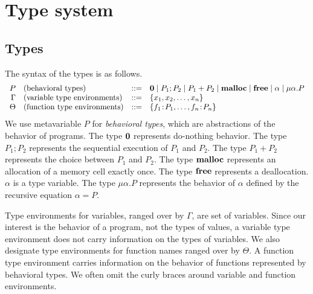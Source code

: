 
\section{Type system}
\label{sec:typesystem}

\subsection{Types}

The syntax of the types is as follows.
\[
\begin{array}{rlcl}
  P & (\mbox{behavioral types})&::=& {\bf 0} \;|\; P_{1};P_{2} \;|\; P_{1}+P_{2} \;|\; \mathbf{malloc} \;|\; \mathbf{free} \;|\; \alpha \;|\; \mu\alpha.P \\
  \Gamma & (\mbox{variable type environments}) &::=& \{x_1, x_2, \dots, x_n\}\\
  \Theta & (\mbox{function type environments}) &::=& \{f_1\!:\! P_1,\dots,f_n\!:\! P_n\}\\
\end{array}
\]
We use metavariable \(P\) for \emph{behavioral types}, which are
abstractions of the behavior of programs.  The type ${\bf 0}$
represents do-nothing behavior.  The type \(P_1;P_2\) represents the
sequential execution of \(P_1\) and \(P_2\).  The type \(P_1 + P_2\)
represents the choice between \(P_1\) and \(P_2\).  The type
\(\mathbf{malloc}\) represents an allocation of a memory cell exactly once.
The type \(\mathbf{free}\) represents a deallocation.  \(\alpha\) is a type
variable. The type \(\mu \alpha.P\) represents the behavior of
\(\alpha\) defined by the recursive equation \(\alpha = P\).

Type environments for variables, ranged over by \(\Gamma\), are set of
variables.  Since our interest is the behavior of a program, not the
types of values, a variable type environment does not carry
information on the types of variables.  We also designate type
environments for function names ranged over by \(\Theta\).  A function
type environment carries information on the behavior of functions
represented by behavioral types.  We often omit the curly braces
around variable and function environments.



